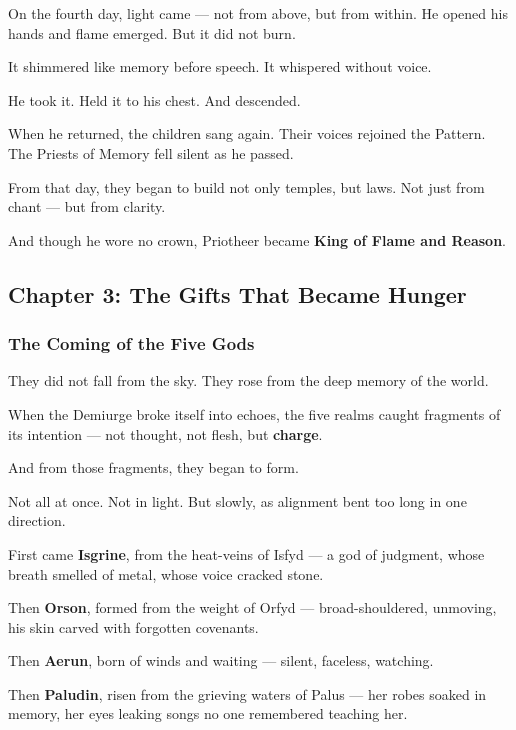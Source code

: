 \documentclass[12pt]{article}
\begin{document}
On the fourth day, light came — not from above, but from within.  
He opened his hands and flame emerged.  
But it did not burn.

It shimmered like memory before speech.  
It whispered without voice.

He took it.  
Held it to his chest.  
And descended.

When he returned, the children sang again.  
Their voices rejoined the Pattern.  
The Priests of Memory fell silent as he passed.

From that day, they began to build not only temples, but laws.  
Not just from chant — but from clarity.

And though he wore no crown, Priotheer became  
\textbf{King of Flame and Reason}.

\newpage

\subsection*{Chapter 3: The Gifts That Became Hunger}

\vspace{.5in}

\subsubsection*{The Coming of the Five Gods}

They did not fall from the sky.  
They rose from the deep memory of the world.

When the Demiurge broke itself into echoes, the five realms caught fragments of its intention —  
not thought, not flesh, but \textbf{charge}.

And from those fragments, they began to form.

Not all at once.  
Not in light.  
But slowly, as alignment bent too long in one direction.

First came \textbf{Isgrine}, from the heat-veins of Isfyd — a god of judgment, whose breath smelled of metal, whose voice cracked stone.  

Then \textbf{Orson}, formed from the weight of Orfyd — broad-shouldered, unmoving, his skin carved with forgotten covenants.  

Then \textbf{Aerun}, born of winds and waiting — silent, faceless, watching.  

Then \textbf{Paludin}, risen from the grieving waters of Palus — her robes soaked in memory, her eyes leaking songs no one remembered teaching her.  
\end{document}
